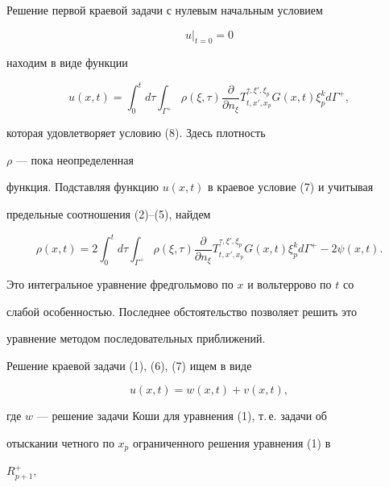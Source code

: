  


Решение первой краевой задачи с нулевым начальным условием 


\begin{equation} 


u|_{t=0}=0 


\end{equation} 


находим в виде функции 


\begin{equation} 


u(x,t)=\int^t_0 d\tau\int_{\Gamma^+}\rho(\xi,\tau) 


\frac{\partial}{\partial n_\xi} 


T^{\tau,\xi',\xi_p}_{t,x',x_p}G(x,t)\xi^k_p d\Gamma^+, 


\end{equation} 


которая удовлетворяет условию (8). Здесь плотность


$\rho$ --- пока неопределенная 


функция. Подставляя функцию $u(x,t)$ в краевое условие (7) и учитывая 


предельные соотношения (2)--(5), найдем 


$$ 


\rho(x,t)=2\int^t_0 d\tau\int_{\Gamma^+}\rho(\xi,\tau) 


\frac{\partial}{\partial n_\xi} 


T^{\tau,\xi',\xi_p}_{t,x',x_p}G(x,t)\xi^k_p 


d\Gamma^+-2\psi(x,t). 


$$ 


Это интегральное уравнение фредгольмово по $x$ и вольтеррово по $t$ со 


слабой особенностью. Последнее обстоятельство позволяет решить это 


уравнение методом последовательных приближений. 


 


Решение краевой задачи (1), (6), (7) ищем в виде 


$$ 


u(x,t)=w(x,t)+v(x,t), 


$$ 


где $w$ --- решение задачи Коши для уравнения (1), т.\,е. задачи об 


отыскании четного по $x_p$ ограниченного решения уравнения (1) в 


$R^+_{p+1}$, 


